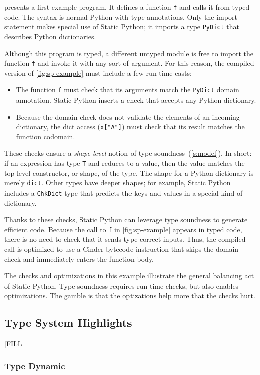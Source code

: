 \documentclass[english,cleveref,submission]{programming}
\newcommand{\SP}{Static Python}
\newcommand{\code}[1]{\texttt{#1}}
\begin{document}
 presents a first example program.
It defines a function \code{f} and calls it from typed code.
The syntax is normal Python with type annotations.
Only the import statement makes special use of \SP{};
it imports a type \code{PyDict} that describes Python dictionaries.

Although this program is typed, a different untyped module is free
to import the function \code{f} and invoke it with any sort of
argument.
For this reason, the compiled version of \cref{fig:sp-example} must
include a few run-time casts:
\begin{itemize}
  \item
    The function \code{f} must check that its arguments match the \code{PyDict} domain annotation.
    \SP{} inserts a check that accepts any Python dictionary.
  \item
    Because the domain check does not validate the elements of an incoming dictionary,
    the dict access (\code{x["A"]}) must check that its result matches the function codomain.
\end{itemize}
These checks ensure a \emph{shape-level} notion of type soundness~(\cref{s:model}).
In short: if an expression has type \code{T} and reduces to a value, then the value
matches the top-level constructor, or shape, of the type.
The shape for a Python dictionary is merely \code{dict}.
Other types have deeper shapes; for example, \SP{} includes a \code{ChkDict}
type that predicts the keys and values in a special kind of dictionary.

Thanks to these checks, \SP{} can leverage type soundness to generate efficient code.
Because the call to \code{f} in \cref{fig:sp-example} appears in typed code,
there is no need to check that it sends type-correct inputs.
Thus, the compiled call is optimized to use a Cinder bytecode instruction
that skips the domain check and immediately enters the function body.

The checks and optimizations in this example illustrate the general balancing act
of \SP{}.
Type soundness requires run-time checks, but also enables optimizations.
The gamble is that the optizations help more that the checks hurt.


\subsection{Type System Highlights}

[FILL]


\subsubsection{Type Dynamic}
\end{document}
